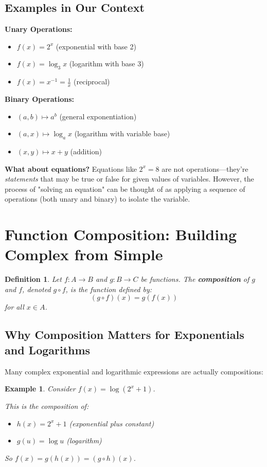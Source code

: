 \documentclass[12pt]{article}
\newtheorem{definition}{Definition}
\newtheorem{example}{Example}
\begin{document}
\subsection{Examples in Our Context}

\textbf{Unary Operations:}
\begin{itemize}
\item $f(x) = 2^x$ (exponential with base 2)
\item $f(x) = \log_3 x$ (logarithm with base 3)
\item $f(x) = x^{-1} = \frac{1}{x}$ (reciprocal)
\end{itemize}

\textbf{Binary Operations:}
\begin{itemize}
\item $(a,b) \mapsto a^b$ (general exponentiation)
\item $(a,x) \mapsto \log_a x$ (logarithm with variable base)
\item $(x,y) \mapsto x + y$ (addition)
\end{itemize}

\textbf{What about equations?} Equations like $2^x = 8$ are not operations—they're \textit{statements} that may be true or false for given values of variables. However, the process of "solving an equation" can be thought of as applying a sequence of operations (both unary and binary) to isolate the variable.

\section{Function Composition: Building Complex from Simple}

\begin{definition}
Let $f: A \to B$ and $g: B \to C$ be functions. The \textbf{composition} of $g$ and $f$, denoted $g \circ f$, is the function defined by:
$$(g \circ f)(x) = g(f(x))$$
for all $x \in A$.
\end{definition}

\subsection{Why Composition Matters for Exponentials and Logarithms}

Many complex exponential and logarithmic expressions are actually compositions:

\begin{example}
Consider $f(x) = \log(2^x + 1)$.

This is the composition of:
\begin{itemize}
\item $h(x) = 2^x + 1$ (exponential plus constant)
\item $g(u) = \log u$ (logarithm)
\end{itemize}

So $f(x) = g(h(x)) = (g \circ h)(x)$.
\end{example}
\end{document}
